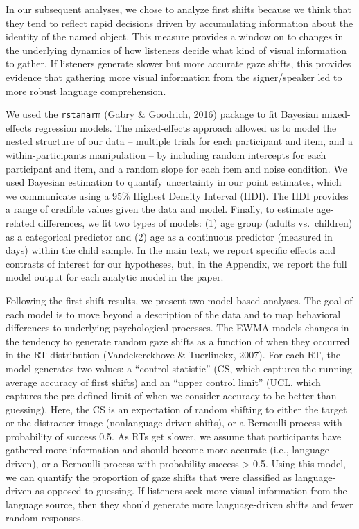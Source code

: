 \documentclass[,man,floatsintext]{apa6}
\begin{document}
In our subsequent analyses, we chose to analyze first shifts because we
think that they tend to reflect rapid decisions driven by accumulating
information about the identity of the named object. This measure
provides a window on to changes in the underlying dynamics of how
listeners decide what kind of visual information to gather. If listeners
generate slower but more accurate gaze shifts, this provides evidence
that gathering more visual information from the signer/speaker led to
more robust language comprehension.

We used the \texttt{rstanarm} (Gabry \& Goodrich, 2016) package to fit
Bayesian mixed-effects regression models. The mixed-effects approach
allowed us to model the nested structure of our data -- multiple trials
for each participant and item, and a within-participants manipulation --
by including random intercepts for each participant and item, and a
random slope for each item and noise condition. We used Bayesian
estimation to quantify uncertainty in our point estimates, which we
communicate using a 95\% Highest Density Interval (HDI). The HDI
provides a range of credible values given the data and model. Finally,
to estimate age-related differences, we fit two types of models: (1) age
group (adults vs.~children) as a categorical predictor and (2) age as a
continuous predictor (measured in days) within the child sample. In the
main text, we report specific effects and contrasts of interest for our
hypotheses, but, in the Appendix, we report the full model output for
each analytic model in the paper.

Following the first shift results, we present two model-based analyses.
The goal of each model is to move beyond a description of the data and
to map behavioral differences to underlying psychological processes. The
EWMA models changes in the tendency to generate random gaze shifts as a
function of when they occurred in the RT distribution (Vandekerckhove \&
Tuerlinckx, 2007). For each RT, the model generates two values: a
\enquote{control statistic} (CS, which captures the running average
accuracy of first shifts) and an \enquote{upper control limit} (UCL,
which captures the pre-defined limit of when we consider accuracy to be
better than guessing). Here, the CS is an expectation of random shifting
to either the target or the distracter image (nonlanguage-driven
shifts), or a Bernoulli process with probability of success 0.5. As RTs
get slower, we assume that participants have gathered more information
and should become more accurate (i.e., language-driven), or a Bernoulli
process with probability success \textgreater{} 0.5. Using this model,
we can quantify the proportion of gaze shifts that were classified as
language-driven as opposed to guessing. If listeners seek more visual
information from the language source, then they should generate more
language-driven shifts and fewer random responses.
\end{document}
